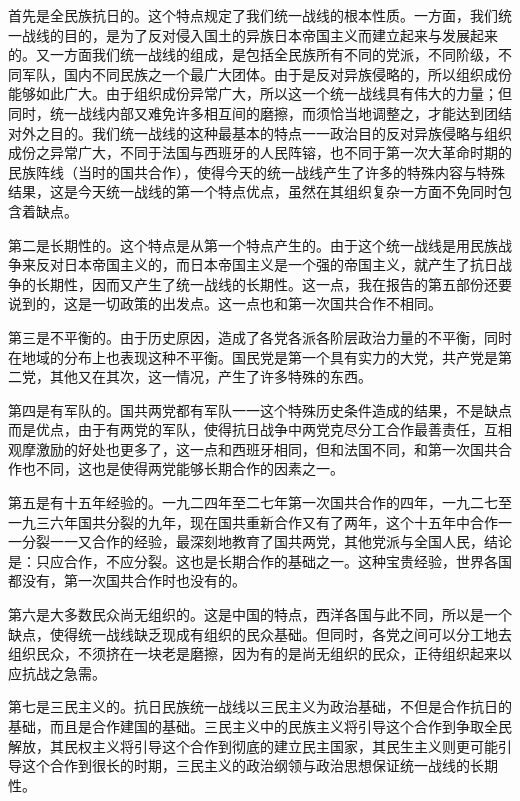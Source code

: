 首先是全民族抗日的。这个特点规定了我们统一战线的根本性质。一方面，我们统一战线的目的，是为了反对侵入国土的异族日本帝国主义而建立起来与发展起来的。又一方面我们统一战线的组成，是包括全民族所有不同的党派，不同阶级，不同军队，国内不同民族之一个最广大团体。由于是反对异族侵略的，所以组织成份能够如此广大。由于组织成份异常广大，所以这一个统一战线具有伟大的力量；但同时，统一战线内部又难免许多相互间的磨擦，而须恰当地调整之，才能达到团结对外之目的。我们统一战线的这种最基本的特点一一政治目的反对异族侵略与组织成份之异常广大，不同于法国与西班牙的人民阵镕，也不同于第一次大革命时期的民族阵线（当时的国共合作），使得今天的统一战线产生了许多的特殊内容与特殊结果，这是今天统一战线的第一个特点优点，虽然在其组织复杂一方面不免同时包含着缺点。

第二是长期性的。这个特点是从第一个特点产生的。由于这个统一战线是用民族战争来反对日本帝国主义的，而日本帝国主义是一个强的帝国主义，就产生了抗日战争的长期性，因而又产生了统一战线的长期性。这一点，我在报告的第五部份还要说到的，这是一切政策的出发点。这一点也和第一次国共合作不相同。

第三是不平衡的。由于历史原因，造成了各党各派各阶层政治力量的不平衡，同时在地域的分布上也表现这种不平衡。国民党是第一个具有实力的大党，共产党是第二党，其他又在其次，这一情况，产生了许多特殊的东西。

第四是有军队的。国共两党都有军队一一这个特殊历史条件造成的结果，不是缺点而是优点，由于有两党的军队，使得抗日战争中两党克尽分工合作最善责任，互相观摩激励的好处也更多了，这一点和西班牙相同，但和法国不同，和第一次国共合作也不同，这也是使得两党能够长期合作的因素之一。

第五是有十五年经验的。一九二四年至二七年第一次国共合作的四年，一九二七至一九三六年国共分裂的九年，现在国共重新合作又有了两年，这个十五年中合作一一分裂一一又合作的经验，最深刻地教育了国共两党，其他党派与全国人民，结论是：只应合作，不应分裂。这也是长期合作的基础之一。这种宝贵经验，世界各国都没有，第一次国共合作时也没有的。

第六是大多数民众尚无组织的。这是中国的特点，西洋各国与此不同，所以是一个缺点，使得统一战线缺乏现成有组织的民众基础。但同时，各党之间可以分工地去组织民众，不须挤在一块老是磨擦，因为有的是尚无组织的民众，正待组织起来以应抗战之急需。

第七是三民主义的。抗日民族统一战线以三民主义为政治基础，不但是合作抗日的基础，而且是合作建国的基础。三民主义中的民族主义将引导这个合作到争取全民解放，其民权主义将引导这个合作到彻底的建立民主国家，其民生主义则更可能引导这个合作到很长的时期，三民主义的政治纲领与政治思想保证统一战线的长期性。

